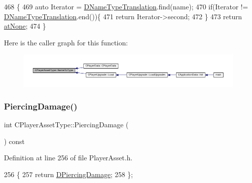 \begin{DoxyCode}
468                                                             \{
469     \textcolor{keyword}{auto} Iterator = \hyperlink{classCPlayerAssetType_a4e7728e5316eb5c1124dcac90f5290d5}{DNameTypeTranslation}.find(name);
470     \textcolor{keywordflow}{if}(Iterator != \hyperlink{classCPlayerAssetType_a4e7728e5316eb5c1124dcac90f5290d5}{DNameTypeTranslation}.end())\{
471         \textcolor{keywordflow}{return} Iterator->second;
472     \}
473     \textcolor{keywordflow}{return} \hyperlink{GameDataTypes_8h_a5600d4fc433b83300308921974477feca82fb51718e2c00981a2d37bc6fe92593}{atNone};
474 \}
\end{DoxyCode}
Here is the caller graph for this function\+:\nopagebreak
\begin{figure}[H]
\begin{center}
\leavevmode
\includegraphics[width=350pt]{classCPlayerAssetType_a42d55b6d7606e021c063fce3a14c56de_icgraph}
\end{center}
\end{figure}
\hypertarget{classCPlayerAssetType_a0ccf10706b29374191644fb6ef2d4132}{}\label{classCPlayerAssetType_a0ccf10706b29374191644fb6ef2d4132} 
\subsubsection{\texorpdfstring{Piercing\+Damage()}{PiercingDamage()}}
{\footnotesize\ttfamily int C\+Player\+Asset\+Type\+::\+Piercing\+Damage (\begin{DoxyParamCaption}{ }\end{DoxyParamCaption}) const\hspace{0.3cm}{\ttfamily [inline]}}



Definition at line 256 of file Player\+Asset.\+h.


\begin{DoxyCode}
256                                   \{
257             \textcolor{keywordflow}{return} \hyperlink{classCPlayerAssetType_af7303175365306fb69e5ff9170b72234}{DPiercingDamage};  
258         \};
\end{DoxyCode}
\hypertarget{classCPlayerAssetType_a6194b4de23ad6a2e2966a868d0fe8d32}{}\label{classCPlayerAssetType_a6194b4de23ad6a2e2966a868d0fe8d32} 
